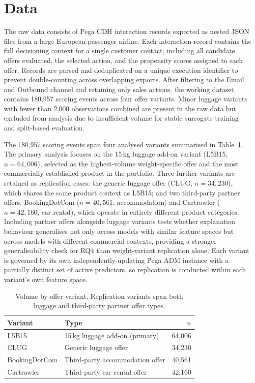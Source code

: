 \documentclass[oneside]{memoir} %
\begin{document}
\section{Data} \label{sec:data}

The raw data consists of Pega CDH interaction records exported as nested JSON files from a large European passenger airline. Each interaction record contains the full decisioning context for a single customer contact, including all candidate offers evaluated, the selected action, and the propensity scores assigned to each offer. Records are parsed and deduplicated on a unique execution identifier to prevent double-counting across overlapping exports. After filtering to the Email and Outbound channel and retaining only sales actions, the working dataset contains 180,957 scoring events across four offer variants. Minor luggage variants with fewer than 2,000 observations combined are present in the raw data but excluded from analysis due to insufficient volume for stable surrogate training and split-based evaluation.

The 180,957 scoring events span four analysed variants summarised in Table~\ref{tab:variants}. The primary analysis focuses on the 15\,kg luggage add-on variant (L5B15, $n = 64{,}006$), selected as the highest-volume weight-specific offer and the most commercially established product in the portfolio. Three further variants are retained as replication cases: the generic luggage offer (CLUG, $n = 34{,}230$), which shares the same product context as L5B15; and two third-party partner offers, BookingDotCom ($n = 40{,}561$, accommodation) and Cartrawler ($n = 42{,}160$, car rental), which operate in entirely different product categories. Including partner offers alongside luggage variants tests whether explanation behaviour generalises not only across models with similar feature spaces but across models with different commercial contexts, providing a stronger generalisability check for RQ4 than weight-variant replication alone. Each variant is governed by its own independently-updating Pega ADM instance with a partially distinct set of active predictors, so replication is conducted within each variant's own feature space.

\begin{table}[ht]
\caption{Volume by offer variant. Replication variants span both luggage and third-party
partner offer types.}
\label{tab:variants}
\centering
\begin{tabular}{llr}
\toprule
Variant & Type & $n$ \\
\midrule
L5B15 & 15\,kg luggage add-on (primary) & 64,006 \\
CLUG & Generic luggage offer & 34,230 \\
BookingDotCom & Third-party accommodation offer & 40,561 \\
Cartrawler & Third-party car rental offer & 42,160 \\
\bottomrule
\end{tabular}
\end{table}
\end{document}
